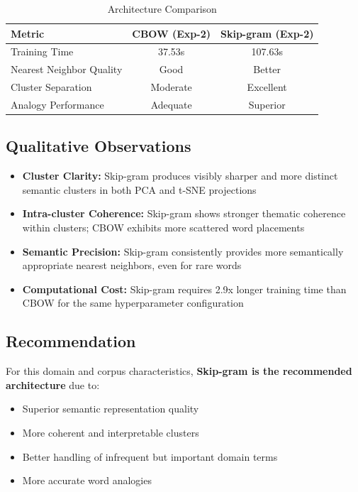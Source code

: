 \documentclass[11pt,a4paper]{report}
\begin{document}
\begin{table}[H]
    \centering
    \caption{Architecture Comparison}
    \label{tab:arch_comparison}
    \begin{tabular}{lcc}
        \toprule
        \textbf{Metric} & \textbf{CBOW (Exp-2)} & \textbf{Skip-gram (Exp-2)} \\
        \midrule
        Training Time & 37.53s & 107.63s \\
        Nearest Neighbor Quality & Good & Better \\
        Cluster Separation & Moderate & Excellent \\
        Analogy Performance & Adequate & Superior \\
        \bottomrule
    \end{tabular}
\end{table}

\subsection{Qualitative Observations}

\begin{itemize}
    \item \textbf{Cluster Clarity:} Skip-gram produces visibly sharper and more distinct semantic clusters in both PCA and t-SNE projections
    \item \textbf{Intra-cluster Coherence:} Skip-gram shows stronger thematic coherence within clusters; CBOW exhibits more scattered word placements
    \item \textbf{Semantic Precision:} Skip-gram consistently provides more semantically appropriate nearest neighbors, even for rare words
    \item \textbf{Computational Cost:} Skip-gram requires 2.9x longer training time than CBOW for the same hyperparameter configuration
\end{itemize}

\subsection{Recommendation}

For this domain and corpus characteristics, \textbf{Skip-gram is the recommended architecture} due to:
\begin{itemize}
    \item Superior semantic representation quality
    \item More coherent and interpretable clusters
    \item Better handling of infrequent but important domain terms
    \item More accurate word analogies
\end{itemize}
\end{document}
